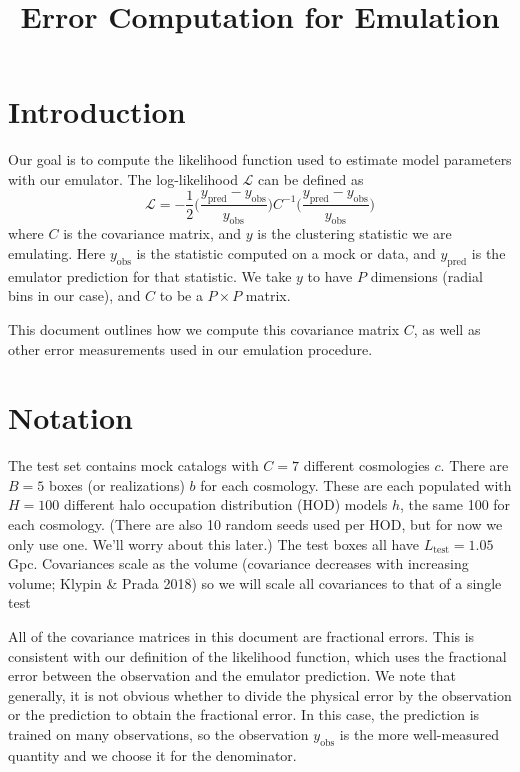 \documentclass[12pt]{article}
\title{Error Computation for Emulation}
\newcommand{\inv}{^{-1}}
\newcommand{\cov}[1]{C^\text{#1}}
\newcommand{\covtot}{C}
\newcommand{\y}[1]{y_{\text{#1}}}
\begin{document}
\maketitle


\section{Introduction}

Our goal is to compute the likelihood function used to estimate model parameters with our emulator.
The log-likelihood $\mathcal{L}$ can be defined as 
\begin{equation}
    \mathcal{L} = -\frac{1}{2} \bigg( \frac{\y{pred} - \y{obs}}{\y{obs}} \bigg) \covtot\inv \bigg( \frac{\y{pred} - \y{obs}}{\y{obs}} \bigg)
\end{equation}
where $\covtot$ is the covariance matrix, and $y$ is the clustering statistic we are emulating.
Here $\y{obs}$ is the statistic computed on a mock or data, and $\y{pred}$ is the emulator prediction for that statistic. 
We take $y$ to have $P$ dimensions (radial bins in our case), and $C$ to be a $P \times P$ matrix.

This document outlines how we compute this covariance matrix $\covtot$, as well as other error measurements used in our emulation procedure.

\section{Notation}
 
The test set contains mock catalogs with $C=7$ different cosmologies $c$. 
There are $B=5$ boxes (or realizations) $b$ for each cosmology. 
These are each populated with $H=100$ different halo occupation distribution (HOD) models $h$, the same 100 for each cosmology. 
(There are also 10 random seeds used per HOD, but for now we only use one. We'll worry about this later.)
The test boxes all have $L_\text{test}=1.05$ Gpc.
Covariances scale as the volume (covariance decreases with increasing volume; Klypin \& Prada 2018) so we will scale all covariances to that of a single test

All of the covariance matrices in this document are fractional errors.
This is consistent with our definition of the likelihood function, which uses the fractional error between the observation and the emulator prediction.
We note that generally, it is not obvious whether to divide the physical error by the observation or the prediction to obtain the fractional error.
In this case, the prediction is trained on many observations, so the observation $\y{obs}$ is the more well-measured quantity and we choose it for the denominator.
\end{document}
